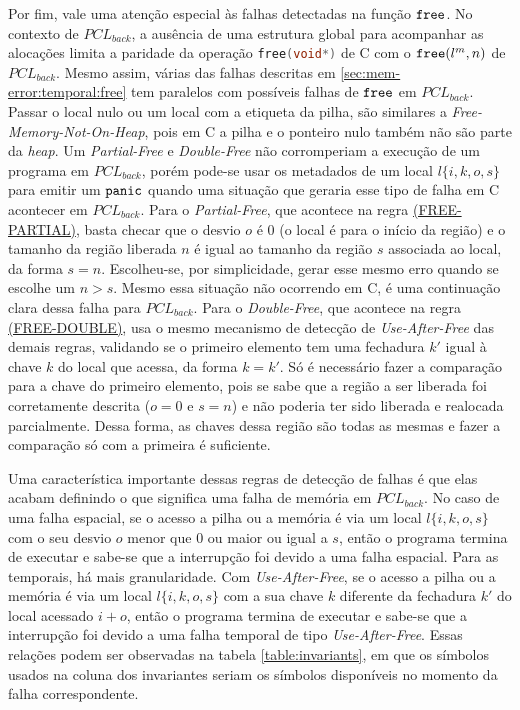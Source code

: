 Por fim, vale uma atenção especial às falhas detectadas na função $\texttt{free}$. No contexto de $PCL_{back}$, a ausência de uma estrutura global para acompanhar as alocações limita a paridade da operação \lstinline[language=C]|free(void*)| de C com o $\texttt{free}(l^m, n)$ de $PCL_{back}$. Mesmo assim, várias das falhas descritas em \ref{sec:mem-error:temporal:free} tem paralelos com possíveis falhas de $\texttt{free}$ em $PCL_{back}$. Passar o local nulo ou um local com a etiqueta da pilha, são similares a \emph{Free-Memory-Not-On-Heap}, pois em C a pilha e o ponteiro nulo também não são parte da \emph{heap}. Um \emph{Partial-Free} e \emph{Double-Free} não corromperiam a execução de um programa em $PCL_{back}$, porém pode-se usar os metadados de um local $l\{i, k, o, s\}$ para emitir um $\texttt{panic}$ quando uma situação que geraria esse tipo de falha em C acontecer em $PCL_{back}$. Para o \emph{Partial-Free}, que acontece na regra \hyperref[rule:free-partial]{(FREE-PARTIAL)}, basta checar que o desvio $o$ é 0 (o local é para o início da região) e o tamanho da região liberada $n$ é igual ao tamanho da região $s$ associada ao local, da forma $s = n$. Escolheu-se, por simplicidade, gerar esse mesmo erro quando se escolhe um $n > s$. Mesmo essa situação não ocorrendo em C, é uma continuação clara dessa falha para $PCL_{back}$. Para o \emph{Double-Free}, que acontece na regra \hyperref[rule:free-double]{(FREE-DOUBLE)}, usa o mesmo mecanismo de detecção de \emph{Use-After-Free} das demais regras, validando se o primeiro elemento tem uma fechadura $k'$ igual à chave $k$ do local que acessa, da forma $k = k'$. Só é necessário fazer a comparação para a chave do primeiro elemento, pois se sabe que a região a ser liberada foi corretamente descrita ($o = 0$ e $s = n$) e não poderia ter sido liberada e realocada parcialmente. Dessa forma, as chaves dessa região são todas as mesmas e fazer a comparação só com a primeira é suficiente.

Uma característica importante dessas regras de detecção de falhas é que elas acabam definindo o que significa uma falha de memória em $PCL_{back}$. No caso de uma falha espacial, se o acesso a pilha ou a memória é via um local $l\{i, k, o, s\}$ com o seu desvio $o$ menor que 0 ou maior ou igual a $s$, então o programa termina de executar e sabe-se que a interrupção foi devido a uma falha espacial. Para as temporais, há mais granularidade. Com \emph{Use-After-Free}, se o acesso a pilha ou a memória é via um local $l\{i, k, o, s\}$ com a sua chave $k$ diferente da fechadura $k'$ do local acessado $i + o$, então o programa termina de executar e sabe-se que a interrupção foi devido a uma falha temporal de tipo \emph{Use-After-Free}. Essas relações podem ser observadas na tabela \ref{table:invariants}, em que os símbolos usados na coluna dos invariantes seriam os símbolos disponíveis no momento da falha correspondente.


